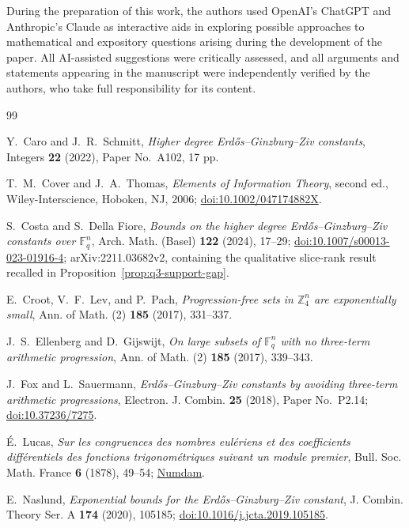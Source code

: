 \documentclass[10pt,a4paper]{amsart}
\theoremstyle{definition}
\newcommand{\F}{\mathbb F}
\newcommand{\1}{\mathbf 1}
\begin{document}
During the preparation of this work, the authors used OpenAI's ChatGPT and Anthropic's Claude as interactive aids in exploring possible approaches to mathematical and expository questions arising during the development of the paper.  All AI-assisted suggestions were critically assessed, and all arguments and statements appearing in the manuscript were independently verified by the authors, who take full responsibility for its content.

\begin{thebibliography}{99}


Y.~Caro and J.~R.~Schmitt,
\emph{Higher degree Erd\H{o}s--Ginzburg--Ziv constants},
Integers \textbf{22} (2022), Paper No.~A102, 17 pp.


T.~M.~Cover and J.~A.~Thomas,
\emph{Elements of Information Theory}, second ed.,
Wiley-Interscience, Hoboken, NJ, 2006;
\href{https://doi.org/10.1002/047174882X}{doi:10.1002/047174882X}.


S.~Costa and S.~Della Fiore,
\emph{Bounds on the higher degree Erd\H{o}s--Ginzburg--Ziv constants over $\F_q^n$},
Arch. Math. (Basel) \textbf{122} (2024), 17--29;
\href{https://doi.org/10.1007/s00013-023-01916-4}{doi:10.1007/s00013-023-01916-4};
arXiv:2211.03682v2, containing the qualitative slice-rank result recalled in Proposition~\ref{prop:q3-support-gap}.

E.~Croot, V.~F.~Lev, and P.~Pach,
\emph{Progression-free sets in $\mathbb Z_4^n$ are exponentially small},
Ann. of Math. (2) \textbf{185} (2017), 331--337.

J.~S.~Ellenberg and D.~Gijswijt,
\emph{On large subsets of $\F_q^n$ with no three-term arithmetic progression},
Ann. of Math. (2) \textbf{185} (2017), 339--343.

J.~Fox and L.~Sauermann,
\emph{Erd\H{o}s--Ginzburg--Ziv constants by avoiding three-term arithmetic progressions},
Electron. J. Combin. \textbf{25} (2018), Paper No.~P2.14;
\href{https://doi.org/10.37236/7275}{doi:10.37236/7275}.


\'E.~Lucas,
\emph{Sur les congruences des nombres eul\'eriens et des coefficients diff\'erentiels des fonctions trigonom\'etriques suivant un module premier},
Bull. Soc. Math. France \textbf{6} (1878), 49--54;
\href{https://archive.numdam.org/item/BSMF_1878__6__49_1/}{Numdam}.

E.~Naslund,
\emph{Exponential bounds for the Erd\H{o}s--Ginzburg--Ziv constant},
J. Combin. Theory Ser. A \textbf{174} (2020), 105185;
\href{https://doi.org/10.1016/j.jcta.2019.105185}{doi:10.1016/j.jcta.2019.105185}.


\end{thebibliography}
\end{document}
